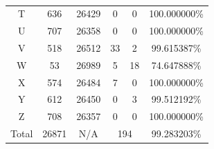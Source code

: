 \documentclass[a4paper, 11pt, oneside]{report}
\begin{document}
\begin{table}
\begin{tabular}{|c|c|c|c|c|c|}
	T & 636 & 26429 & 0 & 0 & 100.000000\% \\ 
	U & 707 & 26358 & 0 & 0 & 100.000000\% \\ 
	V & 518 & 26512 & 33 & 2 & 99.615387\% \\ 
	W & 53 & 26989 & 5 & 18 & 74.647888\% \\ 
	X & 574 & 26484 & 7 & 0 & 100.000000\% \\ 
	Y & 612 & 26450 & 0 & 3 & 99.512192\% \\ 
	Z & 708 & 26357 & 0 & 0 & 100.000000\% \\ 
	\hline
	Total & 26871 & N/A & \multicolumn{2}{|c|}{194} & 99.283203\% \\
	\hline
\end{tabular}
\caption{}
\label{tb:alphaRotShared}
\end{table}
\end{document}
